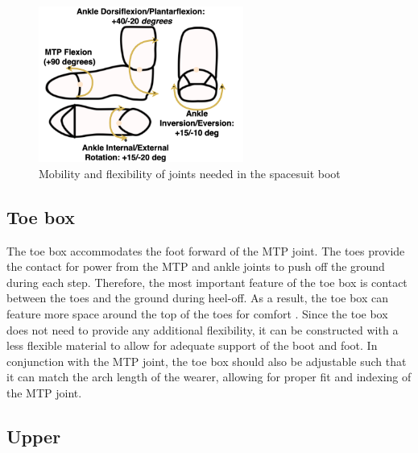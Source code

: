 \documentclass[defaultstyle,11pt]{comps}
\begin{document}
\begin{figure}
\hypertarget{fig:SA3-Mobility}{%
\centering
\includegraphics[width=0.6\textwidth,height=\textheight]{../fig/SA3/Mobility.png}
\caption{Mobility and flexibility of joints needed in the spacesuit boot}\label{fig:SA3-Mobility}
}
\end{figure}

\hypertarget{toe-box}{%
\subsection{Toe box}\label{toe-box}}

The toe box accommodates the foot forward of the MTP joint.
The toes provide the contact for power from the MTP and ankle joints to push off the ground during each step.
Therefore, the most important feature of the toe box is contact between the toes and the ground during heel-off.
As a result, the toe box can feature more space around the top of the toes for comfort \citep{Luximon2009}.
Since the toe box does not need to provide any additional flexibility, it can be constructed with a less flexible material to allow for adequate support of the boot and foot.
In conjunction with the MTP joint, the toe box should also be adjustable such that it can match the arch length of the wearer, allowing for proper fit and indexing of the MTP joint.

\hypertarget{upper}{%
\subsection{Upper}\label{upper}}
\end{document}
